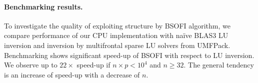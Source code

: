 \documentclass{llncs}
\begin{document}
\paragraph{Benchmarking results.}\label{sec:benchmarking}
%
%
To investigate the quality of exploiting structure by BSOFI algorithm,
we compare performance of our 
CPU implementation with na\"ive BLAS3 LU inversion 
and inversion by multifrontal sparse LU solvers from {\sc UMFPack}. 
Benchmarking shows %
significant speed-up 
of BSOFI with respect to LU inversion. %
We observe up to $22\times$ speed-up if $n\times p < 10^4$ and $n \ge 32$. 
The general tendency is an increase of speed-up with a decrease of $n$.


\end{document}
